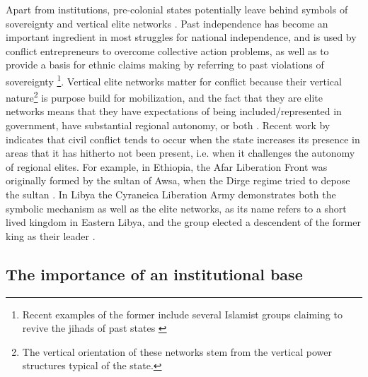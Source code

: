 \documentclass[12pt]{article}
\begin{document}
Apart from institutions, pre-colonial states potentially leave behind symbols of
sovereignty and vertical elite networks \citep{Wishman}. Past independence has
become an important ingredient in most struggles for national independence, and
is used by conflict entrepreneurs to overcome collective action problems, as
well as to provide a basis for ethnic claims making by referring to past
violations of sovereignty \citep{Ahram2019, Shelef2016}\footnote{Recent examples
	of the former include several Islamist groups claiming to revive the
	jihads of past states \citep{Zenn2015}}. Vertical elite networks matter
	for conflict because their vertical nature\footnote{The vertical
		orientation of these networks stem from the vertical power
	structures typical of the state.} is purpose build for mobilization, and
	the fact that they are elite networks means that they have expectations
	of being included/represented in government, have substantial regional
	autonomy, or both \citep{Wishman}. Recent work by \citet{Ying_2020}
	indicates that civil conflict tends to occur when the state increases
	its presence in areas that it has hitherto not been present, i.e. when
	it challenges the autonomy of regional elites. For example, in Ethiopia,
	the Afar Liberation Front was originally formed by the sultan of Awsa,
	when the Dirge regime tried to depose the sultan \citep{Shehim1985,
	Hanfare2011}.  In Libya the Cyraneica Liberation Army demonstrates both
	the symbolic mechanism as well as the elite networks, as its name refers
	to a short lived kingdom in Eastern Libya, and the group elected a
	descendent of the former king as their leader \citep{Ahram2019}.




\subsection{The importance of an institutional base}
\end{document}
